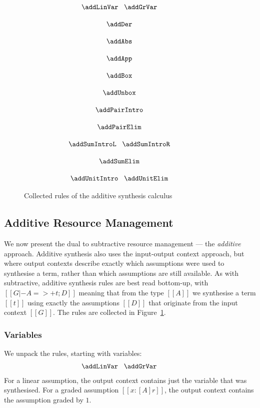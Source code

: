 \begin{figure}[H]
{\footnotesize{
\begin{gather*}
\hspace{-3em}\begin{array}{c}
  \addLinVar
  \;\;\;
  \addGrVar
\\[1.25em]
  \addDer
\\[1.25em]
  \addAbs
\\[1.25em]
  \addApp
\\[1.25em]
  \addBox
\\[1.25em]
  \addUnbox
\\[1.25em]
  \addPairIntro
\\[1.25em]
  \addPairElim
\\[1.25em]
  \addSumIntroL
\;\;\;
  \addSumIntroR
\\[1.25em]
  \addSumElim
\\[1.25em]
  \addUnitIntro
\;\;\;
  \addUnitElim
      \end{array}
  \end{gather*}
}}
\caption{Collected rules of the additive synthesis calculus}
\label{fig:add-rules}
  \end{figure}

\subsection{Additive Resource Management}
\label{subsec:additive}
We now present the dual to subtractive resource management --- the
\emph{additive} approach.
Additive synthesis also uses the input-output context approach, but where
output contexts describe exactly which assumptions were used to synthesise
a term, rather than which assumptions are still available. As with subtractive, additive
   synthesis rules are best read bottom-up, with $[[G |- A =>+ t; D]]$
  meaning that from the type $[[A]]$ we synthesise a term $[[t]]$ using
  exactly the assumptions $[[D]]$ that originate from the input
  context $[[G]]$. The rules are collected in Figure~\ref{fig:add-rules}. 

  \subsubsection{Variables}
  We unpack the rules, starting with variables:
%
\begin{align*}
  \begin{array}{c}
  \hspace{-3em}\addLinVar
  \;\;\;
  \addGrVar
  \end{array}
  \end{align*}
%
For a linear assumption, the output context contains just the variable that was
synthesised. For a graded assumption $[[x : [A] r]]$, the output context
contains the assumption graded by $1$. 

